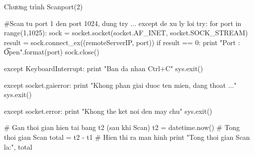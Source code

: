 \documentclass[12pt]{beamer}
\newcommand\Fontvi{\fontsize{6}{7.2}\selectfont} %
\begin{document}
\begin{frame}[fragile]
\begin{block}{Chương trình Scanport(2)}
\Fontvi
\begin{python}
#Scan tu port 1 den port 1024, dung try ... except de xu ly loi
try:
    for port in range(1,1025):  
        sock = socket.socket(socket.AF_INET, socket.SOCK_STREAM)
        result = sock.connect_ex((remoteServerIP, port))
        if result == 0:
            print "Port {}: \t Open".format(port)
        sock.close()

except KeyboardInterrupt:
    print "Ban da nhan Ctrl+C"
    sys.exit()

except socket.gaierror:
    print "Khong phan giai duoc ten mien, dang thoat ..."
    sys.exit()

except socket.error:
    print "Khong the ket noi den may chu"
    sys.exit()

# Gan thoi gian hien tai bang t2 (sau khi Scan)
t2 = datetime.now()
# Tong thoi gian Scan
total =  t2 - t1
# Hien thi ra man hinh
print "Tong thoi gian Scan la:", total
\end{python}
\end{block}
\end{frame}
\end{document}
